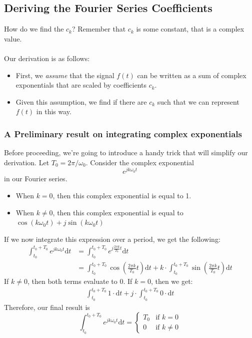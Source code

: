 \documentclass[10pt]{article}
\begin{document}
\subsection*{Deriving the Fourier Series Coefficients}
How do we find the $c_k$?  Remember that $c_k$ is some constant, that is a complex value.\\\\
Our derivation is as follows:
\begin{itemize}
    \item First, we \textit{assume} that the signal $f(t)$ can be written as a sum of complex exponentials that are scaled by coefficients $c_k$.
    \item Given this assumption, we find if there are $c_k$ such that we can represent $f(t)$ in this way.
\end{itemize}

\subsubsection*{A Preliminary result on integrating complex exponentials}
Before proceeding, we're going to introduce a handy trick that will simplify our derivation.  Let $T_0 = 2\pi / \omega_0$.  Consider the complex exponential
\[e^{jk\omega_0 t}\]
in our Fourier series.
\begin{itemize}
    \item When $k = 0$, then this complex exponential is equal to 1.
    \item When $k \neq 0$, then this complex exponential is equal to $\cos(k\omega_0 t) + j\sin(k\omega_0 t)$
\end{itemize}
If we now integrate this expression over a period, we get the following:
\begin{align*}
    \int_{t_0}^{t_0 + T_0} e^{jk\omega_0 t}\text{d}t &= \int_{t_0}^{t_0 + T_0} e^{j \frac{2\pi k}{T_0}t} \text{d}t\\
    &= \int_{t_0}^{t_0 + T_0} \cos\left(\frac{2\pi k}{T_0}t\right)\text{d}t + k \cdot \int_{t_0}^{t_0 + T_0} \sin\left(\frac{2\pi k}{T_0}t\right) \text{d}t
\end{align*}
If $k \neq 0$, then both terms evaluate to 0.  If $k = 0$, then we get:
\begin{align*}
    \int_{t_0}^{t_0 + T_0} 1 \cdot \text{d}t + j \cdot \int_{t_0}^{t_0 + T_0} 0 \cdot \text{d}t
\end{align*}
Therefore, our final result is
\[\int_{t_0}^{t_0 + T_0} e^{jk\omega_0 t}\text{d}t = \begin{cases}T_0 & \text{if $k = 0$} \\ 0 & \text{if $k \neq 0$}\end{cases}\]
\end{document}
